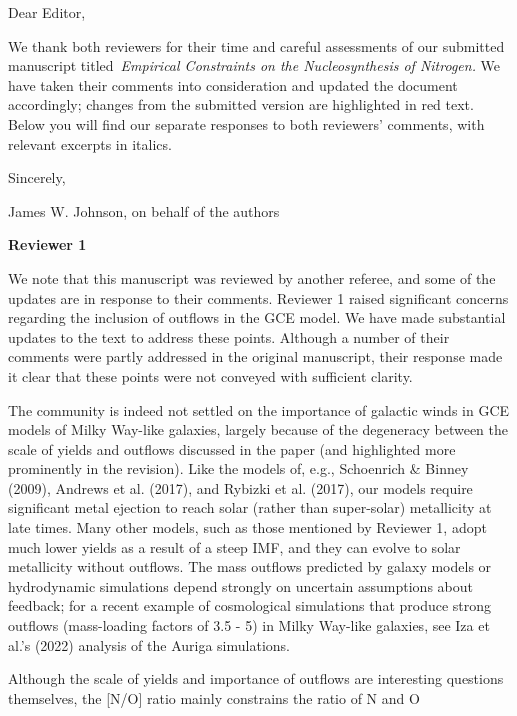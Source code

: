 \documentclass[12pt]{article}
\newcommand\doublebreak[0]{\par\null\par\noindent}
\begin{document}
\noindent
Dear Editor,
\par\null\par\noindent
We thank both reviewers for their time and careful assessments of our
submitted manuscript titled~\textit{Empirical Constraints on the
Nucleosynthesis of Nitrogen.}
We have taken their comments into consideration and updated the document
accordingly; changes from the submitted version are highlighted in red text.
Below you will find our separate responses to both reviewers' comments, with
relevant excerpts in italics.
\doublebreak\null\doublebreak
Sincerely,
\doublebreak
James W. Johnson, on behalf of the authors
\newpage
\begin{center}
\textbf{Reviewer 1}
\makebox[\linewidth]{\rule{0.5\textwidth}{0.4pt}}
\end{center}
\par\noindent
We note that this manuscript was reviewed by another referee, and some of the
updates are in response to their comments.
Reviewer 1 raised significant concerns regarding the inclusion of outflows in
the GCE model.
We have made substantial updates to the text to address these points.
Although a number of their comments were partly addressed in the original
manuscript, their response made it clear that these points were not conveyed
with sufficient clarity.
\par
The community is indeed not settled on the importance of galactic winds in GCE
models of Milky Way-like galaxies, largely because of the degeneracy between
the scale of yields and outflows discussed in the paper (and highlighted more
prominently in the revision).
Like the models of, e.g., Schoenrich \& Binney (2009), Andrews et al. (2017),
and Rybizki et al. (2017), our models require significant metal ejection to
reach solar (rather than super-solar) metallicity at late times.
Many other models, such as those mentioned by Reviewer 1, adopt much lower
yields as a result of a steep IMF, and they can evolve to solar metallicity
without outflows.
The mass outflows predicted by galaxy models or hydrodynamic simulations depend
strongly on uncertain assumptions about feedback; for a recent example of
cosmological simulations that produce strong outflows (mass-loading factors of
3.5 - 5) in Milky Way-like galaxies, see Iza et al.'s (2022) analysis of the
Auriga simulations.
\par
Although the scale of yields and importance of outflows are interesting
questions themselves, the [N/O] ratio mainly constrains the ratio of N and O
\end{document}
